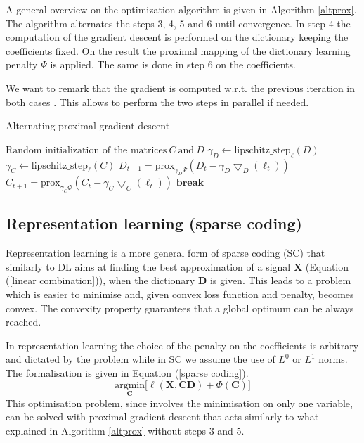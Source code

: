 \documentclass[a4paper,UKenglish]{oasics-v2016}
\begin{document}
A general overview on the optimization algorithm is given in Algorithm  \ref{altprox}. The algorithm alternates the steps 3, 4, 5 and 6 until convergence. In step 4 the computation of the gradient descent is performed on the dictionary keeping the coefficients fixed. On the result the proximal mapping of the dictionary learning penalty $\Psi$ is applied. The same is done in step 6 on the coefficients.

We want to remark that the gradient is computed w.r.t. the previous iteration in both cases \cite{rakotomamonjy2013direct}. This allows to perform the two steps in parallel if needed.

\begin{algorithm}[H]
\caption{Alternating proximal gradient descent}\label{altprox}
\begin{algorithmic}[1]
\State $\text{Random initialization of the matrices}\ C\ \text{and}\ D$
\State $\gamma_D \gets \text{lipschitz\_step}_\ell(D)$
\State $\gamma_C \gets \text{lipschitz\_step}_\ell(C)$
\State $D_{t+1} = \text{prox}_{\gamma_D \Psi}(D_t - \gamma_D \bigtriangledown_D(\ell_t))$
\State $C_{t+1} = \text{prox}_{\gamma_C \Phi}(C_t - \gamma_C \bigtriangledown_C(\ell_t))$
\State $\textbf{break}$
\EndIf
\EndFor
\end{algorithmic}

\end{algorithm}
%
%
\subsection{Representation learning (sparse coding)}
Representation learning is a more general form of sparse coding (SC) that similarly to DL aims at finding the best approximation of a signal $\textbf{X}$ (Equation (\ref{linear combination})), when the dictionary $\textbf{D}$ is given. This leads to a problem which is easier to minimise and, given convex loss function and penalty, becomes convex.
The convexity property guarantees that a global optimum can be always reached.

In representation learning the choice of the penalty on the coefficients is arbitrary and dictated by the problem while in SC we assume the use of $L^0$ or $L^1$ norms. The formalisation is given in Equation (\ref{sparse coding}).
\begin{equation}\label{sparse coding}
\underset{\textbf{C}}{\text{argmin}} \bigg[ \ell(\textbf{X}, \textbf{CD}) + \Phi(\textbf{C}) \bigg]
\end{equation}
This optimisation problem, since involves the minimisation on only one variable, can be solved with proximal gradient descent that acts similarly to what explained in Algorithm \ref{altprox} without steps 3 and 5.
%
%
\end{document}
